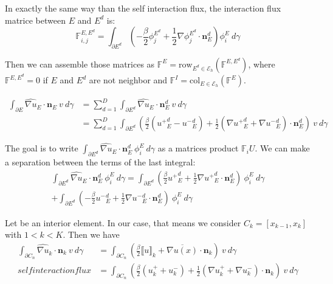 \documentclass[a4paper,10pt]{article}
\begin{document}
In exactly the same way than the self interaction flux, the interaction flux matrice between $E$ 
and $E^d$ is:
\begin{equation*}
 \mathbb{F}_{i,j}^{E,E^d} = \int_{\partial E^d} \left( -\frac{\beta}{2} \phi_j^{E^d} + \frac{1}{2} 
\nabla \phi_j^{E^d} \cdot \mathbf{n}_E^d \right) \phi_i^E \ d \gamma
\end{equation*}

Then we can assemble those matrices as $\mathbb{F}^E = \mathrm{row}_{E^d \in \mathcal{E}_h} 
(\mathbb{F}^{E,E^d})$, where $\mathbb{F}^{E,E^d} = 0$ if $E$ and $E^d$ are not neighbor and 
$\mathbb{F}^I = \mathrm{col}_{E \in \mathcal{E}_h} 
(\mathbb{F}^E)$.

\vspace{10cm}


\begin{align*}
  \int_{\partial E} \widehat{\nabla u}_E \cdot \mathbf{n}_E\ v\ d\gamma &=
  \sum_{d=1}^D \int_{\partial E^d} \widehat{\nabla u}_E \cdot \mathbf{n}_E^d\ v\ d\gamma \\
  &= \sum_{d=1}^D \int_{\partial E^d} \left(\frac{\beta}{2} ({u^+}_E^d - {u^-}_E^d) + \frac{1}{2} 
(\nabla {u^+}_E^d + \nabla {u^-}_E^d) \cdot \mathbf{n}_E^d \right)\ v\ d\gamma
\end{align*}

The goal is to write $\int_{\partial E^d} \widehat{\nabla u}_E \cdot \mathbf{n}_E^d\ \phi_i^E \ 
d\gamma$ as a matrices product $\mathbb{F}_i U$. We can make a separation between the terms of the 
last integral:
\begin{multline*}
 \int_{\partial E^d} \widehat{\nabla u}_E \cdot \mathbf{n}_E^d\ \phi_i^E \ d\gamma
= \int_{\partial E^d} \left( \frac{\beta}{2} {u^+}_E^d + \frac{1}{2} \nabla {u^+}_E^d \cdot 
\mathbf{n}_E^d \right) \ \phi_i^E\ d\gamma \\
+ \int_{\partial E^d} \left( -\frac{\beta}{2} {u^-}_E^d + \frac{1}{2} \nabla {u^-}_E^d \cdot 
\mathbf{n}_E^d \right) \ \phi_i^E\ d\gamma
 \end{multline*}

Let be an interior element. In our case, that means we consider $C_k = [x_{k-1},x_k]$ with $1<k<K$. 
Then we have
\begin{align*}
 \int_{\partial C_n} \widehat{\nabla u}_k \cdot \mathbf{n}_k\ v\ d\gamma &= \int_{\partial C_n} 
\left(\frac{\beta}{2} \llbracket u \rrbracket_k + \overline{\nabla u(x)} \cdot \mathbf{n}_k 
\right)\ v\ d\gamma \\self interaction flux
&= \int_{\partial C_n} \left(\frac{\beta}{2} (u^+_k + u^-_k) + \frac{1}{2} (\nabla u^+_k + \nabla 
u^-_k) \cdot \mathbf{n}_k \right)\ v\ d\gamma \\
\end{align*}
\end{document}
